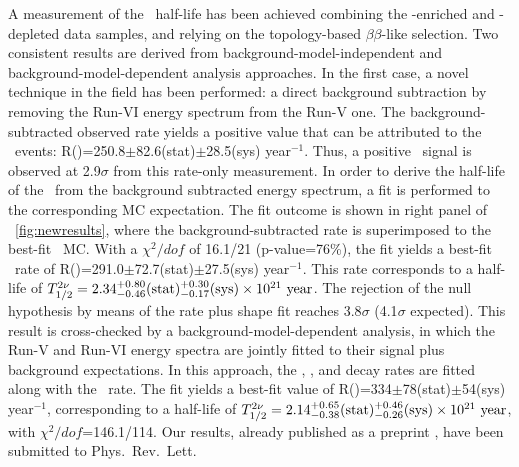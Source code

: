 


A measurement of the  \bbtnu ~half-life has been achieved combining the -enriched and -depleted data samples, and relying on the topology-based $\beta\beta$-like selection. Two consistent results are derived from background-model-independent and background-model-dependent analysis approaches. In the first case, a novel technique in the field has been performed: a direct background subtraction by removing the Run-VI energy spectrum from the Run-V one. The background-subtracted observed rate yields a positive value that can be attributed to the \bbtnu ~events: R()=250.8$\pm$82.6(stat)$\pm$28.5(sys) year$^{-1}$. Thus, a positive \bbtnu ~signal is observed at 2.9$\sigma$ from this rate-only measurement. In order to derive the half-life of the  \bbtnu\ from the background subtracted energy spectrum, a fit is performed to the corresponding MC expectation. The fit outcome is shown in right panel of \fig\ \ref{fig:newresults}, where the background-subtracted rate is superimposed to the best-fit \bbtnu ~MC. With a $\chi^{2}/dof$ of 16.1/21 (p-value=76\%), the fit yields a best-fit \bbtnu ~rate of R()=291.0$\pm$72.7(stat)$\pm$27.5(sys) year$^{-1}$. This rate corresponds to a half-life of $T_{1/2}^{2\nu}=2.34^{+0.80}_{-0.46}(\textrm{stat})^{+0.30}_{-0.17}(\textrm{sys})\times10^{21}~\textrm{year}$. The rejection of the null hypothesis by means of the rate plus shape fit reaches 3.8$\sigma$ (4.1$\sigma$ expected). This result is cross-checked by a background-model-dependent analysis, in which the Run-V and Run-VI energy spectra are jointly fitted to their signal plus background expectations. In this approach, the , ,  and  decay rates are fitted along with the \bbtnu ~rate. The fit yields a best-fit value of R()=334$\pm$78(stat)$\pm$54(sys) year$^{-1}$, corresponding to a half-life of $T_{1/2}^{2\nu}=2.14^{+0.65}_{-0.38}(\textrm{stat})^{+0.46}_{-0.26}(\textrm{sys})\times10^{21}~\textrm{year}$, with $\chi^2/dof$=146.1/114. Our results, already published as
a preprint \cite{nextcollaboration2021measurement}, have been submitted to Phys.~Rev.~Lett. 


